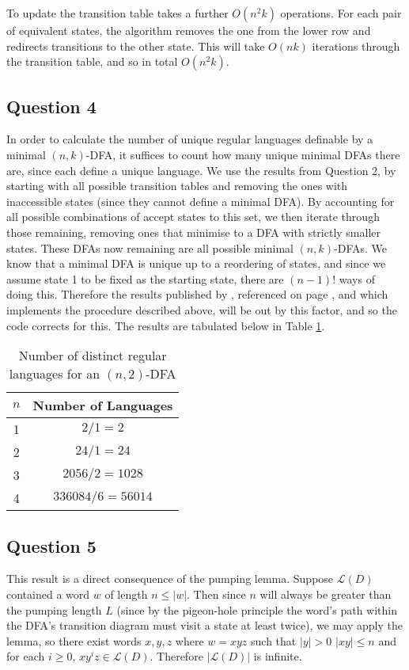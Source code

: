 \documentclass[10pt,a4paper,notitlepage]{article}
\newcommand{\abs}[1]{\lvert#1\rvert}
\begin{document}
To update the transition table takes a further $O(n^{2}k)$ operations. For each pair of equivalent states, the algorithm removes the one from the lower row and redirects transitions to the other state. This will take $O(nk)$ iterations through the transition table, and so in total $O(n^{2}k)$.

\subsection*{\centering Question 4}
In order to calculate the number of unique regular languages definable by a minimal $(n,k)$-DFA, it suffices to count how many unique minimal DFAs there are, since each define a unique language. We use the results from Question 2, by starting with all possible transition tables and removing the ones with inaccessible states (since they cannot define a minimal DFA). By accounting for all possible combinations of accept states to this set, we then iterate through those remaining, removing ones that minimise to a DFA with strictly smaller states. These DFAs now remaining are all possible minimal $(n,k)$-DFAs. We know that a minimal DFA is unique up to a reordering of states, and since we assume state 1 to be fixed as the starting state, there are $(n-1)!$ ways of doing this. Therefore the results published by , referenced on page \pageref{cd:5}, and which implements the procedure described above, will be out by this factor, and so the code corrects for this. The results are tabulated below in Table \ref{tb:6}.
\begin{table}[H]
\centering
\begin{tabular}{c|c}
$n$ & Number of Languages\\
\hline 1 & $2/1=2$\\
2 & $24/1=24$ \\
3 & $2056/2=1028$\\
4 & $336084/6=56014$
\end{tabular}
\caption{Number of distinct regular languages for an $(n,2)$-DFA}\label{tb:6}
\end{table}
\subsection*{\centering Question 5}
This result is a direct consequence of the pumping lemma. Suppose $\mathcal{L}(D)$ contained a word $w$ of length $n\leq \abs{w}$. Then since $n$ will always be greater than the pumping length $L$ (since by the pigeon-hole principle the word's path within the DFA's transition diagram must visit a state at least twice), we may apply the lemma, so there exist words $x,y,z$ where $w=xyz$ such that $\abs{y}>0$ $\abs{xy}\leq n$ and for each $i\geq 0$, $xy^{i}z\in \mathcal{L}(D)$. Therefore $\abs{\mathcal{L}(D)}$ is infinite.
\end{document}
